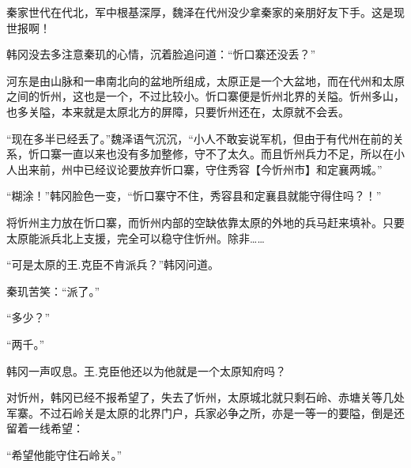 秦家世代在代北，军中根基深厚，魏泽在代州没少拿秦家的亲朋好友下手。这是现世报啊！

韩冈没去多注意秦玑的心情，沉着脸追问道：“忻口寨还没丢？” 

河东是由山脉和一串南北向的盆地所组成，太原正是一个大盆地，而在代州和太原之间的忻州，这也是一个，不过比较小。忻口寨便是忻州北界的关隘。忻州多山，也多关隘，本来就是太原北方的屏障，只要忻州还在，太原就不会丢。 

“现在多半已经丢了。”魏泽语气沉沉，“小人不敢妄说军机，但由于有代州在前的关系，忻口寨一直以来也没有多加整修，守不了太久。而且忻州兵力不足，所以在小人出来前，州中已经议论要放弃忻口寨，守住秀容【今忻州市】和定襄两城。” 

“糊涂！”韩冈脸色一变，“忻口寨守不住，秀容县和定襄县就能守得住吗？！” 

将忻州主力放在忻口寨，而忻州内部的空缺依靠太原的外地的兵马赶来填补。只要太原能派兵北上支援，完全可以稳守住忻州。除非…… 

“可是太原的王.克臣不肯派兵？”韩冈问道。 

秦玑苦笑：“派了。” 

“多少？” 

“两千。” 

韩冈一声叹息。王.克臣他还以为他就是一个太原知府吗？ 

对忻州，韩冈已经不报希望了，失去了忻州，太原城北就只剩石岭、赤塘关等几处军寨。不过石岭关是太原的北界门户，兵家必争之所，亦是一等一的要隘，倒是还留着一线希望： 

“希望他能守住石岭关。”
